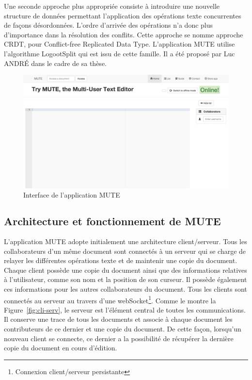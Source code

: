 \documentclass{tnreport}
\begin{document}
Une seconde approche plus appropriée consiste à introduire une nouvelle structure de données permettant l'application des opérations texte concurrentes de façons désordonnées. L'ordre d'arrivée des opérations n'a donc plus d'importance dans la résolution des conflits. Cette approche se nomme approche CRDT, pour Conflict-free Replicated Data Type. L’application MUTE utilise l'algorithme LogootSplit qui est issu de cette famille. Il a été proposé par Luc ANDRÉ dans le cadre de sa thèse.

\begin{figure}[!h]
  \centering
  \includegraphics[width=14cm]{figures/screenshot-mute}
  \caption{Interface de l'application MUTE}
  \label{fig:screen-mute}
\end{figure}


\subsection{Architecture et fonctionnement de MUTE}

L'application MUTE adopte initialement une architecture client/serveur. Tous les collaborateurs d'un même document sont connectés à un serveur qui se charge de relayer les différentes opérations texte et de maintenir une copie du document. Chaque client possède une copie du document ainsi que des informations relatives à l'utilisateur, comme son nom et la position de son curseur. Il possède également ces informations pour les autres collaborateurs du document. Tous les clients sont connectés au serveur au travers d'une webSocket\footnote{Connexion client/serveur persistante}. Comme le montre la Figure~\ref{fig:cli-serv}, le serveur est l'élément central de toutes les communications. Il conserve une trace de tous les documents et associe à chaque document les contributeurs de ce dernier et une copie du document. De cette façon, lorsqu'un nouveau client se connecte, ce dernier a la possibilité de récupérer la dernière copie du document en cours d'édition. 
\end{document}
